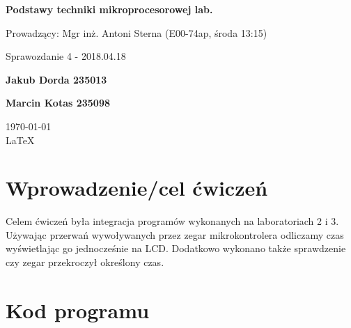 \documentclass[12pt,a4paper]{article}
\begin{document}
	
	\begin{titlepage}
		
		\centering
		{\huge\bfseries Podstawy techniki mikroprocesorowej lab.\par}
		
		\vspace{0.5cm}
		Prowadzący: Mgr inż. Antoni Sterna (E00-74ap, środa 13:15) \\
	
		\vspace{1.1cm}
		{\Large Sprawozdanie 4 - 2018.04.18\par}
		\vfill
		
		{\large\bfseries Jakub Dorda 235013\par}
		{\large\bfseries Marcin Kotas 235098\par}
		
		\vspace{1cm}
		\today \\ \LaTeX
		
		\restoregeometry
	\end{titlepage}


	\section{Wprowadzenie/cel ćwiczeń}
		Celem ćwiczeń była integracja programów wykonanych na laboratoriach 2 i 3. Używając przerwań wywoływanych
		przez zegar mikrokontrolera odliczamy czas wyświetlając go jednocześnie na LCD. Dodatkowo wykonano także
		sprawdzenie czy zegar przekroczył określony czas.
		
	\section{Kod programu}
		\begin{minipage}{.5\textwidth}
			
		\end{minipage}%
		\begin{minipage}{.5\textwidth}
			
		\end{minipage}
		
		\begin{minipage}{.5\textwidth}
			
		\end{minipage}%
		\begin{minipage}{.5\textwidth}
			
		\end{minipage}
		
\end{document}
